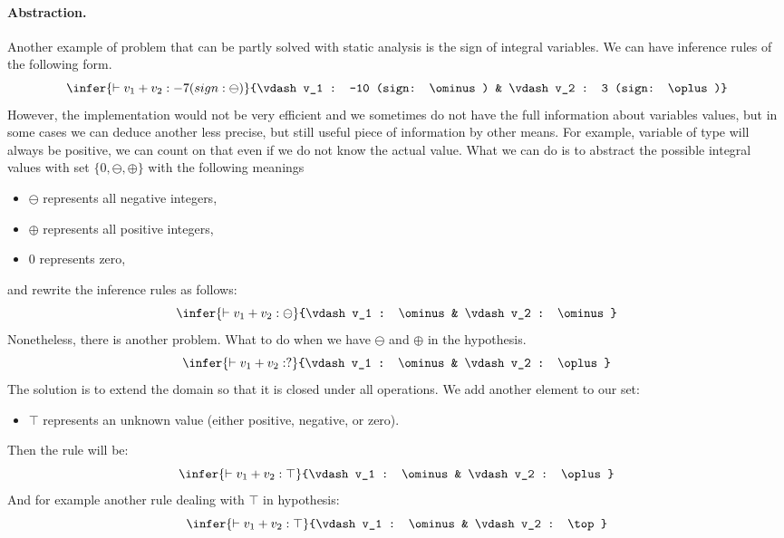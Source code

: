         \paragraph{Abstraction.}
        Another example of problem that can be partly solved with static analysis 
        is the sign of integral variables. We can have inference rules of the 
        following form.
        $$
        \infer{\vdash v_1+v_2 : -7 (sign: \ominus)}
        {\vdash v_1 : -10 (sign: \ominus) & \vdash v_2 : 3 (sign: \oplus)}
        $$
        However, the implementation would not be very efficient and we sometimes 
        do not have the full information about variables values, but in some cases 
        we can deduce another less precise, but still useful piece of information 
        by other means. For example, variable of 
        type  will always be positive, we can count on that 
        even if we do not know the actual value. What we 
        can do is to abstract the possible integral values with set 
        $\{0, \ominus, \oplus\}$ with the following meanings         
        \begin{itemize}
            \item $\ominus$ represents all negative integers,
            \item $\oplus$ represents all positive integers,
            \item $0$ represents zero,
        \end{itemize}                
        and rewrite the inference rules as follows:
        $$
        \infer{\vdash v_1+v_2 : \ominus}
        {\vdash v_1 : \ominus & \vdash v_2 : \ominus}
        $$
        Nonetheless, there is another problem. What to do when we have $\ominus$ 
        and $\oplus$ in the hypothesis.
        $$
        \infer{\vdash v_1+v_2 : ?}
        {\vdash v_1 : \ominus & \vdash v_2 : \oplus}
        $$
        The solution is to extend the domain so that it is closed under all operations. 
        We add another element to our set:
        \begin{itemize}
            \item $\top$ represents an unknown value (either positive, negative, or zero).
        \end{itemize}
        Then the rule will be:
        $$
        \infer{\vdash v_1+v_2 : \top}
        {\vdash v_1 : \ominus & \vdash v_2 : \oplus}
        $$
        And for example another rule dealing with $\top$ in hypothesis:
        $$
        \infer{\vdash v_1+v_2 : \top}
        {\vdash v_1 : \ominus & \vdash v_2 : \top}
        $$               
    
